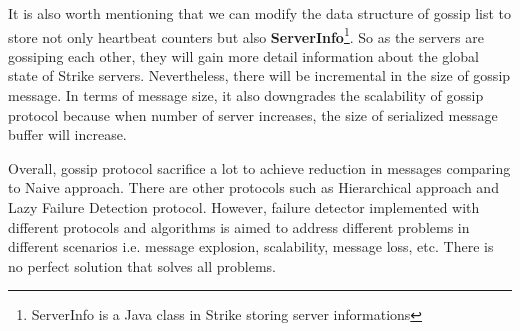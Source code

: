 \documentclass[dareport.tex]{subfiles}
\begin{document}
It is also worth mentioning that we can modify the data structure of gossip list to store not only heartbeat counters but also \textbf{ServerInfo}\footnote{ServerInfo is a Java class in Strike storing server informations}. So as the servers are gossiping each other, they will gain more detail information about the global state of Strike servers. Nevertheless, there will be incremental in the size of gossip message. In terms of message size, it also downgrades the scalability of gossip protocol because when number of server increases, the size of serialized message buffer will increase.

Overall, gossip protocol sacrifice a lot to achieve reduction in messages comparing to Naive approach. There are other protocols such as Hierarchical approach and Lazy Failure Detection protocol\cite{failuredetector}. However, failure detector implemented with different protocols and algorithms is aimed to address different problems in different scenarios i.e. message explosion, scalability, message loss, etc. There is no perfect solution that solves all problems.
\end{document}
